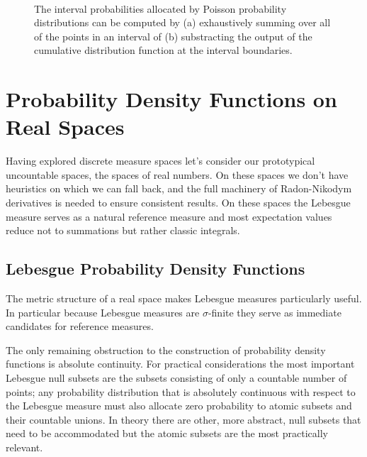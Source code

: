 \documentclass[
  letterpaper,
  DIV=11,
  numbers=noendperiod]{scrartcl}
\begin{document}
\begin{figure}
\begin{minipage}[t]{0.45\linewidth}
{{}

}

\subcaption{\label{fig-poisson-diff}}
\end{minipage}%
%
\begin{minipage}[t]{0.05\linewidth}

{\centering 

~

}

\end{minipage}%

\caption{\label{fig-poisson-interval-prob}The interval probabilities
allocated by Poisson probability distributions can be computed by (a)
exhaustively summing over all of the points in an interval of (b)
substracting the output of the cumulative distribution function at the
interval boundaries.}

\end{figure}

\hypertarget{probability-density-functions-on-real-spaces}{%
\section{Probability Density Functions on Real
Spaces}\label{probability-density-functions-on-real-spaces}}

Having explored discrete measure spaces let's consider our prototypical
uncountable spaces, the spaces of real numbers. On these spaces we don't
have heuristics on which we can fall back, and the full machinery of
Radon-Nikodym derivatives is needed to ensure consistent results. On
these spaces the Lebesgue measure serves as a natural reference measure
and most expectation values reduce not to summations but rather classic
integrals.

\hypertarget{lebesgue-probability-density-functions}{%
\subsection{Lebesgue Probability Density
Functions}\label{lebesgue-probability-density-functions}}

The metric structure of a real space makes Lebesgue measures
particularly useful. In particular because Lebesgue measures are
\(\sigma\)-finite they serve as immediate candidates for reference
measures.

The only remaining obstruction to the construction of probability
density functions is absolute continuity. For practical considerations
the most important Lebesgue null subsets are the subsets consisting of
only a countable number of points; any probability distribution that is
absolutely continuous with respect to the Lebesgue measure must also
allocate zero probability to atomic subsets and their countable unions.
In theory there are other, more abstract, null subsets that need to be
accommodated but the atomic subsets are the most practically relevant.
\end{document}
